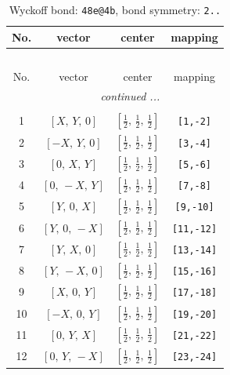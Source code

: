 \documentclass[fleqn,8pt]{jsarticle}
\begin{document}
\renewcommand{\arraystretch}{1.2}
\begin{longtable}{cccc}
\caption{Wyckoff bond: {\tt 48e@4b}, bond symmetry: {\tt 2..}}
 \\
 \hline \hline
No. & vector & center & mapping \\ \hline \endfirsthead

\multicolumn{3}{l}{\tablename\ \thetable{}} \\
 \hline \hline
No. & vector & center & mapping \\ \hline \endhead

 \hline \hline
\multicolumn{3}{r}{\footnotesize\it continued ...} \\ \endfoot

 \hline \hline
\multicolumn{3}{r}{} \\ \endlastfoot

1 & $\left[ X,\, Y,\, 0 \right]$ & $\left[ \frac{1}{2},\, \frac{1}{2},\, \frac{1}{2} \right]$ & {\tt [1,-2]} \\ \hline
2 & $\left[ - X,\, Y,\, 0 \right]$ & $\left[ \frac{1}{2},\, \frac{1}{2},\, \frac{1}{2} \right]$ & {\tt [3,-4]} \\ \hline
3 & $\left[ 0,\, X,\, Y \right]$ & $\left[ \frac{1}{2},\, \frac{1}{2},\, \frac{1}{2} \right]$ & {\tt [5,-6]} \\ \hline
4 & $\left[ 0,\, - X,\, Y \right]$ & $\left[ \frac{1}{2},\, \frac{1}{2},\, \frac{1}{2} \right]$ & {\tt [7,-8]} \\ \hline
5 & $\left[ Y,\, 0,\, X \right]$ & $\left[ \frac{1}{2},\, \frac{1}{2},\, \frac{1}{2} \right]$ & {\tt [9,-10]} \\ \hline
6 & $\left[ Y,\, 0,\, - X \right]$ & $\left[ \frac{1}{2},\, \frac{1}{2},\, \frac{1}{2} \right]$ & {\tt [11,-12]} \\ \hline
7 & $\left[ Y,\, X,\, 0 \right]$ & $\left[ \frac{1}{2},\, \frac{1}{2},\, \frac{1}{2} \right]$ & {\tt [13,-14]} \\ \hline
8 & $\left[ Y,\, - X,\, 0 \right]$ & $\left[ \frac{1}{2},\, \frac{1}{2},\, \frac{1}{2} \right]$ & {\tt [15,-16]} \\ \hline
9 & $\left[ X,\, 0,\, Y \right]$ & $\left[ \frac{1}{2},\, \frac{1}{2},\, \frac{1}{2} \right]$ & {\tt [17,-18]} \\ \hline
10 & $\left[ - X,\, 0,\, Y \right]$ & $\left[ \frac{1}{2},\, \frac{1}{2},\, \frac{1}{2} \right]$ & {\tt [19,-20]} \\ \hline
11 & $\left[ 0,\, Y,\, X \right]$ & $\left[ \frac{1}{2},\, \frac{1}{2},\, \frac{1}{2} \right]$ & {\tt [21,-22]} \\ \hline
12 & $\left[ 0,\, Y,\, - X \right]$ & $\left[ \frac{1}{2},\, \frac{1}{2},\, \frac{1}{2} \right]$ & {\tt [23,-24]} \\
\end{longtable}
\end{document}
